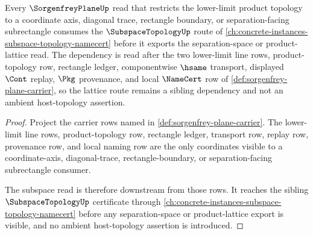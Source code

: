 \begin{theorem}
\label{thm:sorgenfrey-plane-subspace-forward-lattice}
Every $\SorgenfreyPlaneUp$ read that restricts the lower-limit product topology to a coordinate axis, diagonal trace, rectangle boundary, or separation-facing subrectangle consumes the $\SubspaceTopologyUp$ route of \autoref{ch:concrete-instances-subspace-topology-namecert} before it exports the separation-space or product-lattice read. The dependency is read after the two lower-limit line rows, product-topology row, rectangle ledger, componentwise $\hsame$ transport, displayed $\Cont$ replay, $\Pkg$ provenance, and local $\NameCert$ row of \autoref{def:sorgenfrey-plane-carrier}, so the lattice route remains a sibling dependency and not an ambient host-topology assertion.
\end{theorem}
\begin{proof}
Project the carrier rows named in \autoref{def:sorgenfrey-plane-carrier}. The lower-limit line rows, product-topology row, rectangle ledger, transport row, replay row, provenance row, and local naming row are the only coordinates visible to a coordinate-axis, diagonal-trace, rectangle-boundary, or separation-facing subrectangle consumer.

The subspace read is therefore downstream from those rows. It reaches the sibling $\SubspaceTopologyUp$ certificate through \autoref{ch:concrete-instances-subspace-topology-namecert} before any separation-space or product-lattice export is visible, and no ambient host-topology assertion is introduced.
\end{proof}
